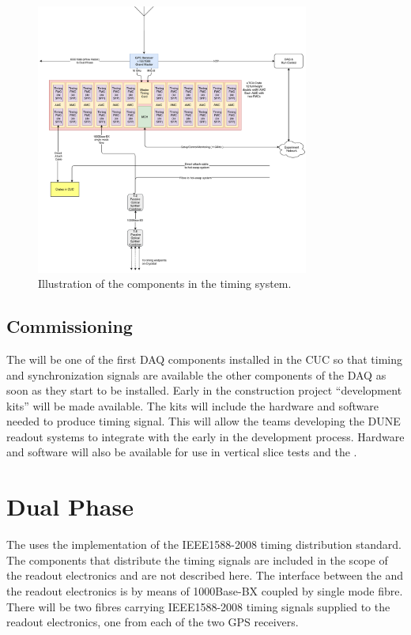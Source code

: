 \documentclass{article}
\begin{document}
\begin{figure}[H]
  \includegraphics[width=0.8\textwidth]{DUNE_SP_Timing_1nov18.pdf}
  \caption{Illustration of the components in the \single timing system.}
  \label{fig:daq-readout-sp-timing}
\end{figure}

\subsection{Commissioning}

The  will be one of the first DAQ components installed in the CUC so that timing and synchronization signals are available the other components of the DAQ as soon as they start to be installed. Early in the construction project  ``development kits'' will be made available. The kits will include the hardware and software needed to produce  timing signal. This will allow the teams developing the DUNE readout systems to integrate with the  early in the development process. Hardware and software will also be available for use in vertical slice tests and the . 

\section{Dual Phase}

The  uses the  implementation of the IEEE1588-2008 timing distribution standard. The components that distribute the timing signals are included in the scope of the  readout electronics and are not described here. The interface between the  and the  readout electronics is by means of 1000Base-BX  coupled by single mode fibre. There will be two fibres carrying IEEE1588-2008 timing signals supplied to the  readout electronics, one from each of the two GPS receivers.



\printglossary
\end{document}
